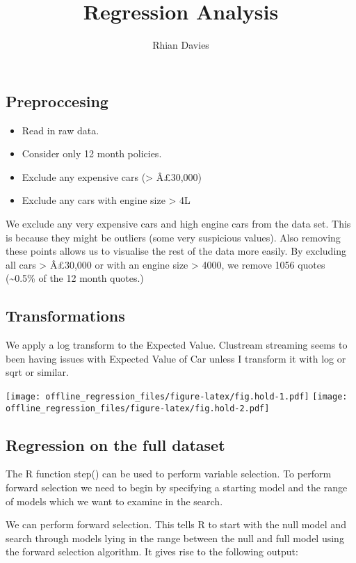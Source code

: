 \documentclass[]{article}
\title{Regression Analysis}
\author{Rhian Davies}
\date{}
\providecommand{\tightlist}{%
  \setlength{\itemsep}{0pt}\setlength{\parskip}{0pt}}
\begin{document}
\maketitle

\subsection{Preproccesing}\label{preproccesing}

\begin{itemize}
\tightlist
\item
  Read in raw data.
\item
  Consider only 12 month policies.
\item
  Exclude any expensive cars (\textgreater{} Â£30,000)
\item
  Exclude any cars with engine size \textgreater{} 4L
\end{itemize}

We exclude any very expensive cars and high engine cars from the data
set. This is because they might be outliers (some very suspicious
values). Also removing these points allows us to visualise the rest of
the data more easily. By excluding all cars \textgreater{} Â£30,000 or
with an engine size \textgreater{} 4000, we remove 1056 quotes
(\textasciitilde{}0.5\% of the 12 month quotes.)

\subsection{Transformations}\label{transformations}

We apply a log transform to the Expected Value. Clustream streaming
seems to been having issues with Expected Value of Car unless I
transform it with log or sqrt or similar.

\texttt{[image: offline\_regression\_files/figure-latex/fig.hold-1.pdf]}
\texttt{[image: offline\_regression\_files/figure-latex/fig.hold-2.pdf]}

\subsection{Regression on the full
dataset}\label{regression-on-the-full-dataset}

The R function step() can be used to perform variable selection. To
perform forward selection we need to begin by specifying a starting
model and the range of models which we want to examine in the search.

We can perform forward selection. This tells R to start with the null
model and search through models lying in the range between the null and
full model using the forward selection algorithm. It gives rise to the
following output:
\end{document}
